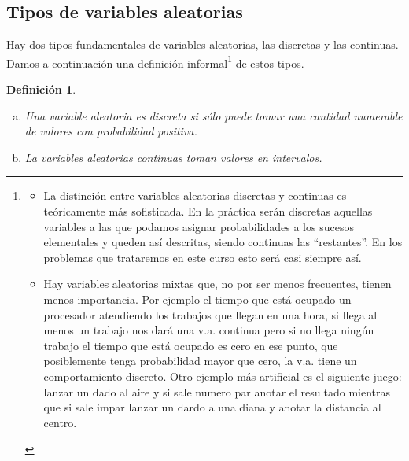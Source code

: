 \documentclass[12pt]{report}
\newtheorem{definition}{Definici\'on}
\begin{document}
\subsection{Tipos de variables aleatorias}
       Hay dos tipos fundamentales de variables aleatorias, las discretas y las continuas.
       Damos a continuación una definición informal\footnote{
\begin{itemize}
\item La distinción entre variables aleatorias discretas y continuas es teóricamente más
sofisticada. En la práctica serán discretas aquellas variables a las que podamos asignar
probabilidades a los sucesos elementales y queden así descritas, siendo continuas las
``restantes''. En los problemas que trataremos en este curso esto será casi siempre así.
      \item  Hay variables aleatorias mixtas que, no por ser menos frecuentes, tienen menos
importancia.  Por ejemplo el tiempo que está ocupado un procesador atendiendo los trabajos
que llegan en una hora, si llega al menos un trabajo nos dará una v.a. continua pero si no
llega ningún trabajo el tiempo que está ocupado es cero en ese punto, que posiblemente
tenga probabilidad mayor que cero, la v.a. tiene un comportamiento discreto. Otro ejemplo
más artificial es el siguiente juego: lanzar un dado al aire y  si sale numero par anotar
el resultado mientras que  si sale impar lanzar un dardo a una diana y anotar la distancia
al centro. \end{itemize}} de estos tipos.
\begin{definition}
    \begin{enumerate}[a)]
    \item Una variable aleatoria es discreta si sólo puede tomar una cantidad numerable de valores con probabilidad
     positiva.
    \item La variables aleatorias continuas  toman  valores en intervalos.
\end{enumerate}
\end{definition}
\end{document}
